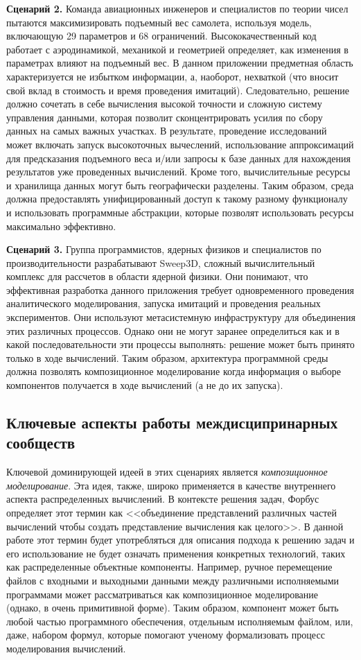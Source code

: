 \textbf{Сценарий 2.} Команда авиационных инженеров и специалистов по теории чисел пытаются максимизировать подъемный вес самолета, используя модель, включающую 29 параметров и 68 ограничений. Высококачественный код работает с аэродинамикой, механикой и геометрией определяет, как изменения в параметрах влияют на подъемный вес. В данном приложении предметная область характеризуется не избытком информации, а, наоборот, нехваткой (что вносит свой вклад в стоимость и время проведения имитаций). Следовательно, решение должно сочетать в себе вычисления высокой точности и сложную систему управления данными, которая позволит сконцентрировать усилия по сбору данных на самых важных участках. В результате, проведение исследований может включать запуск высокоточных вычеслений, использование аппроксимаций для предсказания подъемного веса и/или запросы к базе данных для нахождения результатов уже проведенных вычислений. Кроме того, вычислительные ресурсы и хранилища данных могут быть географически разделены. Таким образом, среда должна предоставлять унифицированный доступ к такому разному функционалу и использовать программные абстракции, которые позволят использовать ресурсы максимально эффективно.

\textbf{Сценарий 3.} Группа программистов, ядерных физиков и специалистов по производительности разрабатывают Sweep3D, сложный вычислительный комплекс для рассчетов в области ядерной физики. Они понимают, что эффективная разработка данного приложения требует одновременного проведения аналитического моделирования, запуска имитаций и проведения реальных экспериментов. Они используют метасистемную инфраструктуру для объединения этих различных процессов. Однако они не могут заранее определиться как и в какой последовательности эти процессы выполнять: решение может быть принято только в ходе вычислений. Таким образом, архитектура программной среды должна позволять композиционное моделирование когда информация о выборе компонентов получается в ходе вычислений (а не до их запуска).

\subsection{Ключевые аспекты работы междисципринарных сообществ}
\label{aspects}

Ключевой доминирующей идеей в этих сценариях является \emph{композиционное моделирование}. Эта идея, также, широко применяется в качестве внутреннего аспекта распределенных вычислений. В контексте решения задач, Форбус определяет этот термин как <<объединение представлений различных частей вычислений чтобы создать представление вычисления как целого>>. В данной работе этот термин будет употребляться для описания подхода к решению задач и его использование не будет означать применения конкретных технологий, таких как распределенные объектные компоненты.  Например, ручное перемещение файлов с входными и выходными данными между различными исполняемыми программами может рассматриваться как композиционное моделирование (однако, в очень примитивной форме). Таким образом, компонент может быть любой частью программного обеспечения, отдельным исполняемым файлом, или, даже, набором формул, которые помогают ученому формализовать процесс моделирования вычислений.

